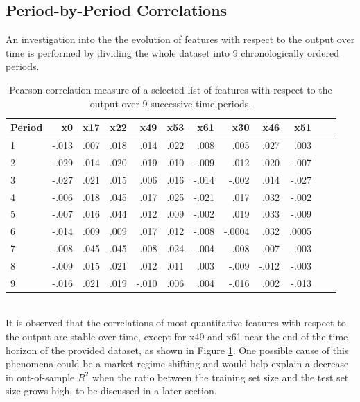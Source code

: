 \documentclass[
11pt, %
a4paper, %
oneside, %
headinclude,footinclude, %
BCOR5mm, %
]{scrartcl}
\begin{document}
\subsection{Period-by-Period Correlations}
An investigation into the the evolution of features with respect to the output over time is performed by dividing the whole dataset into 9 chronologically ordered
periods.\\
\begin{table}[ht!]
\small
\center
\begin{tabular}{lrrrrrrrrrrr}  
\toprule
Period & x0 & x17&	x22 	& x49	& x53 	 &	x61	 &			x30 &		x46 &		x51\\
\midrule
1 & 	-.013 & .007 & 	.018		& 	.014	& 	.022		& 	.008	& 		.005	& 	.027	& 	.003\\
2 & 	-.029  & .014 & 	.020	& 	.019	& 	.010			& 	-.009		& 	.012	& 	.020	& 	-.007\\
3 & 	-.027 & .021 & 	.015	& 	.006	& 	.016			& 	-.014		& 	-.002	& 	.014	& 	-.027\\
4 & 	-.006 & .018 & 	.045	& 	.017	& 	.025			& 	-.021		& 	.017	& 	.032	& 	-.002\\
5 & 	-.007  & .016 & 	.044	& 	.012	& 	.009			& 	-.002		& 	.019	& 	.033	& 	-.009\\
6 & 	-.014 & .009& 	.009 	& 	.017	& 	.012			& 	-.008		& 	-.0004	& 	.032	& 	.0005\\
7 & 	-.008 & .045 & 	.045	& 	.008	& 	.024			& 	-.004	& 	-.008		& 	.007	& 	-.003\\
8 & 	-.009 & .015 & 	.021		& 	.012	& 	.011		& 	.003	& 	-.009		& 	-.012	& 	-.003\\
9 & 	-.016 & .021 & 	.019	& 	-.010	& 	.006			& 	.004	& 	-.016		& 	.002	& 	-.013\\
\bottomrule
\end{tabular}
	\caption{\label{corr} Pearson correlation measure of a selected list of features with respect to the output over 9 successive time periods.} 
\end{table}\\
It is observed that the correlations of most quantitative features with respect to the output are stable over time, except for x49 and x61 near the end of
the time horizon of the provided dataset, as shown in Figure \ref{corr}. One possible cause of this phenomena could be a market regime shifting and would help explain a decrease in out-of-sample $R^2$ when the ratio between the training set size and the test set size grows high, to be discussed in a later section. 
\end{document}
